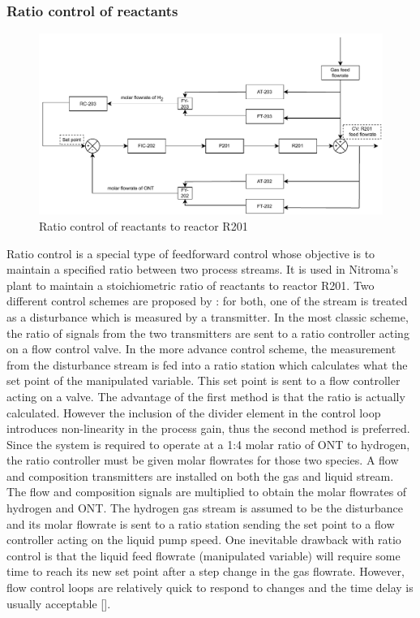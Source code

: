 \subsubsection{Ratio control of reactants} %
\begin{figure}
    \centering
    \includegraphics[width=\linewidth]{chapters/4-operation-control/4-Figures/R201-FC.pdf}
    \caption{Ratio control of reactants to reactor R201}
    \label{fig:R201-FC}
\end{figure} 
Ratio control is a special type of feedforward control whose objective is to maintain a specified ratio between two process streams. It is used in Nitroma's plant to maintain a stoichiometric ratio of reactants to reactor R201. Two different control schemes are proposed by \textcite{}: for both, one of the stream is treated as a disturbance which is measured by a transmitter. In the most classic scheme, the ratio of signals from the two transmitters are sent to a ratio controller acting on a flow control valve. In the more advance control scheme, the measurement from the disturbance stream is fed into a ratio station which calculates what the set point of the manipulated variable. This set point is sent to a flow controller acting on a valve. The advantage of the first method is that the ratio is actually calculated. However the inclusion of the divider element in the control loop introduces non-linearity in the process gain, thus the second method is preferred. Since the system is required to operate at a 1:4 molar ratio of ONT to hydrogen, the ratio controller must be given molar flowrates for those two species. A flow and composition transmitters are installed on both the gas and liquid stream. The flow and composition signals are multiplied to obtain the molar flowrates of hydrogen and ONT. The hydrogen gas stream is assumed to be the disturbance and its molar flowrate is sent to a ratio station sending the set point to a flow controller acting on the liquid pump speed. One inevitable drawback with ratio control is that the liquid feed flowrate (manipulated variable) will require some time to reach its new set point after a step change in the gas flowrate. However, flow control loops are relatively quick to respond to changes and the time delay is usually acceptable [].




